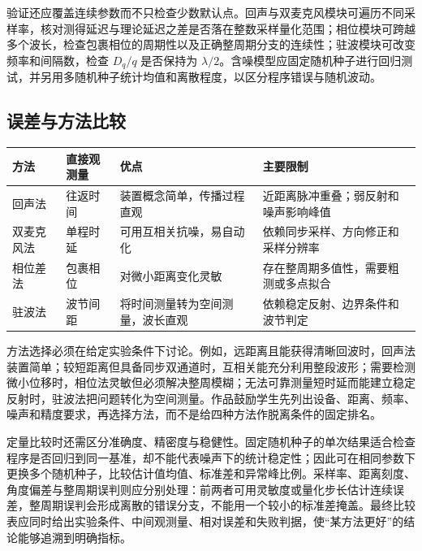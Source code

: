 \documentclass[UTF8,a4paper,zihao=-4]{ctexart}
\begin{document}
验证还应覆盖连续参数而不只检查少数默认点。回声与双麦克风模块可遍历不同采样率，核对测得延迟与理论延迟之差是否落在整数采样量化范围；相位模块可跨越多个波长，检查包裹相位的周期性以及正确整周期分支的连续性；驻波模块可改变频率和间隔数，检查 $D_q/q$ 是否保持为 $\lambda/2$。含噪模型应固定随机种子进行回归测试，并另用多随机种子统计均值和离散程度，以区分程序错误与随机波动。

\subsection{误差与方法比较}
\begin{table}[!htb]
\centering
\begin{tabularx}{\textwidth}{p{2.7cm}p{3.0cm}X X}
\toprule
方法 & 直接观测量 & 优点 & 主要限制\\
\midrule
回声法 & 往返时间 & 装置概念简单，传播过程直观 & 近距离脉冲重叠；弱反射和噪声影响峰值\\
双麦克风法 & 单程时延 & 可用互相关抗噪，易自动化 & 依赖同步采样、方向修正和采样分辨率\\
相位差法 & 包裹相位 & 对微小距离变化灵敏 & 存在整周期多值性，需要粗测或多点拟合\\
驻波法 & 波节间距 & 将时间测量转为空间测量，波长直观 & 依赖稳定反射、边界条件和波节判定\\
\bottomrule
\end{tabularx}
\end{table}

方法选择必须在给定实验条件下讨论。例如，远距离且能获得清晰回波时，回声法装置简单；较短距离但具备同步双通道时，互相关能充分利用整段波形；需要检测微小位移时，相位法灵敏但必须解决整周模糊；无法可靠测量短时延而能建立稳定反射时，驻波法把问题转化为空间测量。作品鼓励学生先列出设备、距离、频率、噪声和精度要求，再选择方法，而不是给四种方法作脱离条件的固定排名。

定量比较时还需区分准确度、精密度与稳健性。固定随机种子的单次结果适合检查程序是否回归到同一基准，却不能代表噪声下的统计稳定性；因此可在相同参数下更换多个随机种子，比较估计值均值、标准差和异常峰比例。采样率、距离刻度、角度偏差与整周期误判则应分别处理：前两者可用灵敏度或量化步长估计连续误差，整周期误判会形成离散的错误分支，不能用一个较小的标准差掩盖。最终比较表应同时给出实验条件、中间观测量、相对误差和失败判据，使“某方法更好”的结论能够追溯到明确指标。
\end{document}
